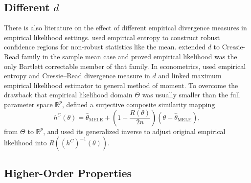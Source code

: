 \subsection{Different $d$ }

There is also literature on the effect of different empirical divergence
measures in empirical likelihood settings. \citet{hall1999biased}
used empirical entropy to construct robust confidence regions for
non-robust statistics like the mean. \citet{baggerly1998empirical}
extended $d$ to Cressie-Read family in the sample mean case and proved
empirical likelihood was the only Bartlett correctable member of that
family. In econometrics, \citet{mittelhammer2000econometric} used
empirical entropy and Cressie--Read divergence measure in $d$ and
linked maximum empirical likelihood estimator to general method of
moment. To overcome the drawback that empirical likelihood domain
$\Theta$ was usually smaller than the full parameter space $\mathbb{R}^{p}$,
\citet{tsao2014extended} defined a surjective composite similarity
mapping 
\[
h^{C}\left(\theta\right)=\hat{\theta}_{\mathrm{MELE}}+\left(1+\frac{R\left(\theta\right)}{2n}\right)\left(\theta-\hat{\theta}_{\mathrm{MELE}}\right),
\]
from $\Theta$ to $\mathbb{R}^{p}$, and used its generalized inverse
to adjust original empirical likelihood into $R\left(\left(h^{C}\right)^{-1}\left(\theta\right)\right)$. 


\subsection{Higher-Order Properties }

